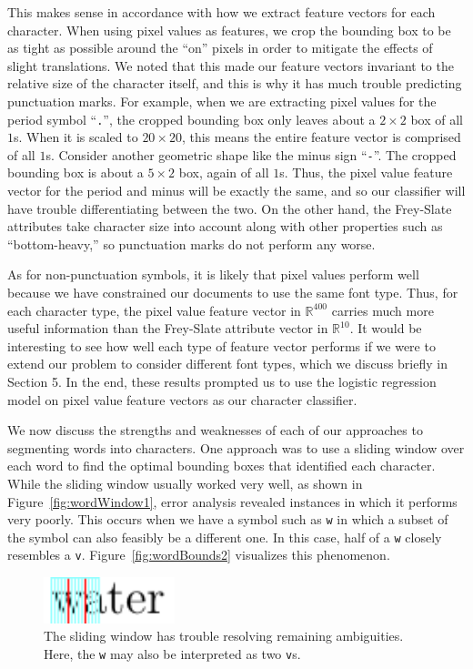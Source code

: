 \documentclass[10pt]{IEEEtran}
\begin{document}
This makes sense in accordance with how we extract feature vectors for each character. When using pixel values as features, we crop the bounding box to be as tight as possible around the ``on'' pixels in order to mitigate the effects of slight translations. We noted that this made our feature vectors invariant to the relative size of the character itself, and this is why it has much trouble predicting punctuation marks. For example, when we are extracting pixel values for the period symbol ``\texttt{.}'', the cropped bounding box only leaves about a $2 \times 2$ box of all $1$s. When it is scaled to $20 \times 20$, this means the entire feature vector is comprised of all $1$s. Consider another geometric shape like the minus sign ``\texttt{-}''. The cropped bounding box is about a $5 \times 2$ box, again of all $1$s. Thus, the pixel value feature vector for the period and minus will be exactly the same, and so our classifier will have trouble differentiating between the two. On the other hand, the Frey-Slate attributes take character size into account along with other properties such as ``bottom-heavy,'' so punctuation marks do not perform any worse.

As for non-punctuation symbols, it is likely that pixel values perform well because we have constrained our documents to use the same font type. Thus, for each character type, the pixel value feature vector in $\mathbb{R}^{400}$ carries much more useful information than the Frey-Slate attribute vector in $\mathbb{R}^{10}$. It would be interesting to see how well each type of feature vector performs if we were to extend our problem to consider different font types, which we discuss briefly in Section 5. In the end, these results prompted us to use the logistic regression model on pixel value feature vectors as our character classifier.

We now discuss the strengths and weaknesses of each of our approaches to segmenting words into characters. One approach was to use a sliding window over each word to find the optimal bounding boxes that identified each character. While the sliding window usually worked very well, as shown in Figure~\ref{fig:wordWindow1}, error analysis revealed instances in which it performs very poorly. This occurs when we have a symbol such as \texttt{w} in which a subset of the symbol can also feasibly be a different one. In this case, half of a \texttt{w} closely resembles a \texttt{v}. Figure~\ref{fig:wordBounds2} visualizes this phenomenon.

\begin{figure}[h]
  \centering
    \includegraphics[width=1.5in]{word6-window.png}
  \caption{The sliding window has trouble resolving remaining ambiguities. Here, the \texttt{w} may also be interpreted as two \texttt{v}s.}
  \label{fig:wordWindow2}
\end{figure}
\end{document}
